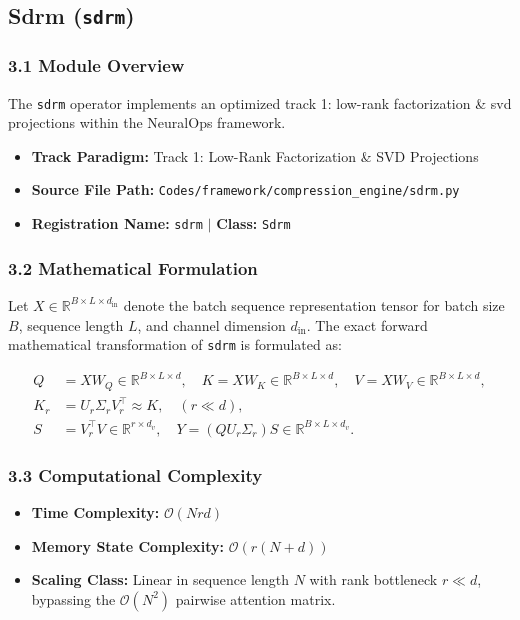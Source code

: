 \subsection{Sdrm (\texttt{sdrm})}
\label{sec:app_module_sdrm}

\subsubsection*{3.1 Module Overview}
The \texttt{sdrm} operator implements an optimized track 1: low-rank factorization \& svd projections within the NeuralOps framework.
\begin{itemize}
    \item \textbf{Track Paradigm:} Track 1: Low-Rank Factorization & SVD Projections
    \item \textbf{Source File Path:} \texttt{Codes/framework/compression\_engine/sdrm.py}
    \item \textbf{Registration Name:} \texttt{sdrm} $\mid$ \textbf{Class:} \texttt{Sdrm}
\end{itemize}

\subsubsection*{3.2 Mathematical Formulation}
Let $X \in \mathbb{R}^{B \times L \times d_{\text{in}}}$ denote the batch sequence representation tensor for batch size $B$, sequence length $L$, and channel dimension $d_{\text{in}}$. The exact forward mathematical transformation of \texttt{sdrm} is formulated as:

\begin{align}
Q &= X W_Q \in \mathbb{R}^{B \times L \times d}, \quad K = X W_K \in \mathbb{R}^{B \times L \times d}, \quad V = X W_V \in \mathbb{R}^{B \times L \times d}, \\
K_r &= U_r \Sigma_r V_r^\top \approx K, \quad (r \ll d), \\
S &= V_r^\top V \in \mathbb{R}^{r \times d_v}, \quad Y = (Q U_r \Sigma_r) S \in \mathbb{R}^{B \times L \times d_v}.
\end{align}


\subsubsection*{3.3 Computational Complexity}
\begin{itemize}
    \item \textbf{Time Complexity:} $\mathcal{O}(N r d)$
    \item \textbf{Memory State Complexity:} $\mathcal{O}(r(N + d))$
    \item \textbf{Scaling Class:} Linear in sequence length $N$ with rank bottleneck $r \ll d$, bypassing the $\mathcal{O}(N^2)$ pairwise attention matrix.
\end{itemize}


